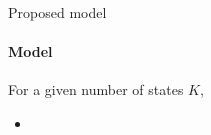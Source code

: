 \begin{frame}[fragile]{Proposed model}
\paragraph{Model}
For a given number of states $K$, 

\begin{itemize}
\item
\end{itemize}

\end{frame}

